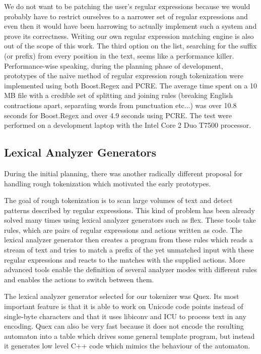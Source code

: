 We do not want to be patching the user's regular expressions because we would
probably have to restrict ourselves to a narrower set of regular expressions
and even then it would have been harrowing to actually implement such a system
and prove its correctness. Writing our own regular expression matching engine
is also out of the scope of this work. The third option on the list, searching
for the suffix (or prefix) from every position in the text, seems like a
performance killer. Performance-wise speaking, during the planning phase of
development, prototypes of the naive method of regular expression rough
tokenization were implemented using both Boost.Regex and PCRE. The average
time spent on a 10 MB file with a credible set of splitting and joining rules
(breaking English contractions apart, separating words from punctuation
etc...) was over 10.8 seconds for Boost.Regex and over 4.9 seconds using
PCRE. The test were performed on a development laptop with the Intel Core 2
Duo T7500 processor.

\subsection{Lexical Analyzer Generators}
\label{ssec:impl-roughtok-lexergen}

During the initial planning, there was another radically different proposal for
handling rough tokenization which motivated the early prototypes.

The goal of rough tokenization is to scan large volumes of text and detect
patterns described by regular expressions. This kind of problem has been
already solved many times using lexical analyzer generators such as flex. These
tools take rules, which are pairs of regular expressions and actions written as
code. The lexical analyzer generator then creates a program from these rules
which reads a stream of text and tries to match a prefix of the yet unmatched
input with these regular expressions and reacts to the matches with the
supplied actions. More advanced tools enable the definition of several analyzer
modes with different rules and enables the actions to switch between them.

The lexical analyzer generator selected for our tokenizer was Quex. Its most
important feature is that it is able to work on Unicode code points instead of
single-byte characters and that it uses libiconv and ICU to process text in any
encoding. Quex can also be very fast because it does not encode the resulting
automaton into a table which drives some general template program, but instead
it generates low level C++ code which mimics the behaviour of the automaton.

